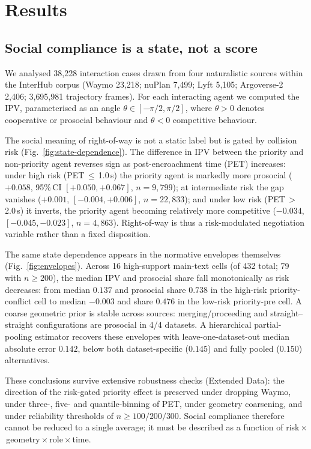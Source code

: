 \documentclass[12pt,a4paper]{article}
\begin{document}
\section{Results}

\subsection{Social compliance is a state, not a score}
We analysed 38{,}228 interaction cases drawn from four naturalistic sources within the
InterHub corpus (Waymo 23{,}218; nuPlan 7{,}499; Lyft 5{,}105; Argoverse-2 2{,}406;
3{,}695{,}981 trajectory frames). For each interacting agent we computed the IPV,
parameterised as an angle $\theta\in[-\pi/2,\pi/2]$, where $\theta>0$ denotes cooperative
or prosocial behaviour and $\theta<0$ competitive behaviour.

The social meaning of right-of-way is not a static label but is gated by collision risk
(Fig.~\ref{fig:state-dependence}). The difference in IPV between the priority and
non-priority agent reverses sign as post-encroachment time (PET) increases: under high risk
(PET\,$\le$\,1.0\,s) the priority agent is markedly more prosocial
($+0.058$, 95\%\,CI $[+0.050,+0.067]$, $n=9{,}799$); at intermediate risk the gap vanishes
($+0.001$, $[-0.004,+0.006]$, $n=22{,}833$); and under low risk (PET\,$>$\,2.0\,s) it
inverts, the priority agent becoming relatively more competitive
($-0.034$, $[-0.045,-0.023]$, $n=4{,}863$). Right-of-way is thus a risk-modulated
negotiation variable rather than a fixed disposition.

The same state dependence appears in the normative envelopes themselves
(Fig.~\ref{fig:envelopes}). Across 16 high-support main-text cells (of 432 total; 79 with
$n\ge200$), the median IPV and prosocial share fall monotonically as risk decreases: from
median $0.137$ and prosocial share $0.738$ in the high-risk priority-conflict cell to
median $-0.003$ and share $0.476$ in the low-risk priority-pre cell. A coarse geometric
prior is stable across sources: merging/proceeding and straight--straight configurations
are prosocial in 4/4 datasets. A hierarchical partial-pooling estimator recovers these
envelopes with leave-one-dataset-out median absolute error $0.142$, below both
dataset-specific ($0.145$) and fully pooled ($0.150$) alternatives.

These conclusions survive extensive robustness checks (Extended Data): the
direction of the risk-gated priority effect is preserved under dropping Waymo, under
three-, five- and quantile-binning of PET, under geometry coarsening, and under
reliability thresholds of $n\ge100/200/300$. Social compliance therefore cannot be reduced
to a single average; it must be described as a function of
risk\,$\times$\,geometry\,$\times$\,role\,$\times$\,time.
\end{document}
